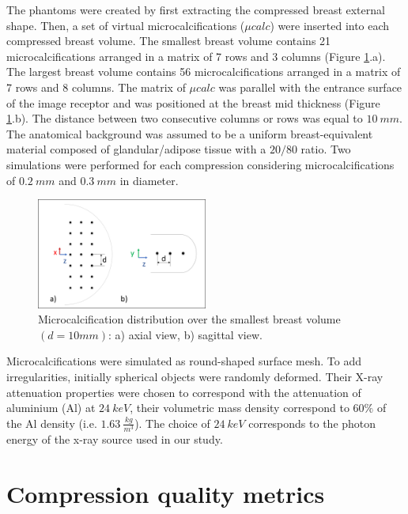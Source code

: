The phantoms were created by first extracting the compressed breast external shape. Then, a set of virtual microcalcifications ($\mu calc$) were inserted into each compressed breast volume. The smallest breast volume contains 21 microcalcifications arranged in a matrix of 7 rows and 3 columns (Figure \ref{fig:microcalcifications}.a). The largest breast volume contains 56 microcalcifications arranged in a matrix of 7 rows and 8 columns. The matrix of $\mu calc$ was parallel with the entrance surface of the image receptor and was positioned at the breast mid thickness (Figure \ref{fig:microcalcifications}.b). The distance between two consecutive columns or rows was equal to $10\ mm$. The anatomical background was assumed to be a uniform breast-equivalent material composed of glandular/adipose tissue with a $20/80$ ratio. Two simulations were performed for each compression considering microcalcifications of $0.2\ mm$ and $0.3\ mm$ in diameter.

\begin{figure}[!h]
\centering
\includegraphics[width=0.5\textwidth,keepaspectratio]{figures/microcalcifications.png} 
\caption{Microcalcification distribution over the smallest breast volume $(d=10mm)$: a) axial view, b) sagittal view.}\label{fig:microcalcifications}
\end{figure}


Microcalcifications were simulated as round-shaped surface mesh. To add irregularities, initially spherical objects were randomly deformed. Their X-ray attenuation properties were chosen to correspond with the attenuation of aluminium (Al) at $24 \ keV$, their volumetric mass density correspond to $60\%$ of the Al density (i.e. $1.63\ \frac{kg}{m^3}$).  The choice of $24\ keV$ corresponds to the photon energy of the x-ray source used in our study. 


\section{Compression quality metrics}\label{section:compressionqualitymetrics}

